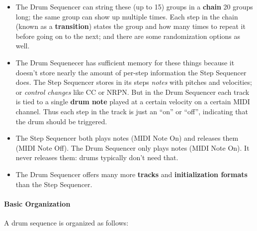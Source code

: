 \documentclass{article}
\begin{document}
\begin{itemize}
\item The Drum Sequencer can string these (up to 15) groups in a {\bf chain} 20 groups long; the same group can show up multiple times.  Each step in the chain (known as a {\bf transition}) states the group and how many times to repeat it before going on to the next; and there are some randomization options as well.
\item The Drum Sequenecer has sufficient memory for these things because it doesn't store nearly the amount of per-step information the Step Sequencer does. The Step Sequencer stores in its steps {\it notes} with pitches and velocities; or {\it control changes} like CC or NRPN.  But in the Drum Sequencer each track is tied to a single {\bf drum note} played at a certain velocity on a certain MIDI channel.  Thus each step in the track is just an ``on'' or ``off'', indicating that the drum should be triggered.
\item The Step Sequencer both plays notes (MIDI Note On) and releases them (MIDI Note Off).  The Drum Sequencer only plays notes (MIDI Note On).  It never releases them: drums typically don't need that.
\item The Drum Sequencer offers many more {\bf tracks} and {\bf initialization formats} than the Step Sequencer.
\end{itemize}

\paragraph{Basic Organization} A drum sequence is organized as follows:
\end{document}
